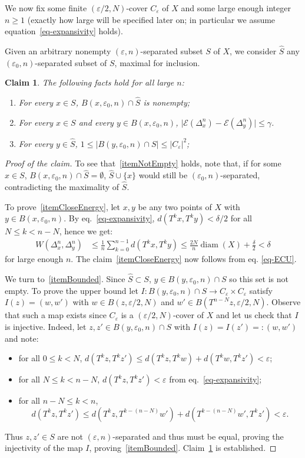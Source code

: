 \documentclass[AHL, Unicode, longabstracts,published]{cedram}
\theoremstyle{plain}
\theoremstyle{plain}
\newtheorem{claim}{Claim}
\newcommand\eps{\varepsilon}
\newcommand{\diam}{\operatorname{diam}}
\newcounter{In}
\newcommand*\8{\infty}
\newcommand\hS{\widehat{S}}
\newcommand{\En}{\mathcal{E}}
\newcommand*{\romanenumi}{\renewcommand*{\theenumi}{\roman{enumi}}}
\begin{document}
We now fix some finite $(\eps/2,N)$-cover $C_\eps$ of $X$ and some large enough integer $n\geq1$ (exactly how large will be specified later on; in particular we assume equation~\eqref{eq-expansivity} holds).


Given an arbitrary nonempty $(\eps,n)$-separated subset $S$ of $X$, we consider $\hS$ any $(\eps_0,n)$-separated subset of $S$, maximal for inclusion.

\begin{claim}\label{claim-W}
The following facts hold for all large $n$:
\begin{enumerate}\romanenumi
\item\label{itemNotEmpty}
For every $x\in S$, $B(x,\eps_0,n)\cap \hS$ is nonempty;
\item\label{itemCloseEnergy}
For every $x\in S$ and every $y\in B(x,\eps_0,n)$, $\lvert \En(\Delta^n_x)-\En(\Delta^n_y) \rvert \leq \gamma $.
\item\label{itemBounded}
For every $y\in \hS$, $1\le \lvert B(y,\eps_0,n)\cap S \rvert \le \lvert C_\eps\rvert^2$;
\end{enumerate}
\end{claim}

\begin{proof}[Proof of the claim]
To see that~\eqref{itemNotEmpty} holds, note that, if for some $x\in S$, $B(x,\eps_0,n)\cap \hS=\emptyset$, $\hS\cup\{x\}$ would still be $(\eps_0,n)$-separated, contradicting the maximality of $\hS$.

To prove~\eqref{itemCloseEnergy}, let $x,y$ be any two points of $X$ with $y\in B(x,\eps_0,n)$. By eq.~\eqref{eq-expansivity}, $d(T^kx,T^ky)<\delta/2$ for all $N\leq k<n-N$, hence we get:
\[
\begin{aligned}
W\left(\Delta^n_x,\Delta^n_y\right) &\leq \frac1n\sum_{k=0}^{n-1} d\left(T^kx,T^ky\right)
\leq \frac{2N}{n}\diam(X) + \frac\delta2 <\delta
\end{aligned}
\]
for large enough $n$. The claim~\eqref{itemCloseEnergy} now follows from eq. \eqref{eq-ECU}.

We turn to~\eqref{itemBounded}. Since $\hS\subset S$, $y\in B(y,\eps_0,n)\cap S$ so this set is not empty. To prove the upper bound let $I:B(y,\eps_0,n)\cap S\to C_\eps\times C_\eps$ satisfy $I(z)=(w,w')$ with $w\in B(z,\eps/2,N)$ and $w'\in B(T^{n-N}z,\eps/2,N)$. Observe that such a map exists since $C_\eps$ is a $(\eps/2,N)$-cover of $X$ and let us check that $I$ is injective. Indeed, let $z,z'\in B(y,\eps_0,n)\cap S$ with $I(z)=I(z')=:(w,w')$ and note:
\begin{itemize}
\item for all $0\leq k<N$, $d(T^kz,T^kz')\leq d(T^kz,T^kw)+d(T^kw,T^kz') <\eps$;
\item for all $N\leq k<n-N$, $d(T^kz,T^kz') < \eps$ from eq.~\eqref{eq-expansivity};
\item for all $n-N\leq k<n$,
\[
d\left(T^kz,T^kz'\right)\leq d\left(T^kz,T^{k-(n-N)}w'\right)+d\left(T^{k-(n-N)}w',T^kz'\right) <\eps.
\]
\end{itemize}
Thus $z,z'\in S$ are not $(\eps,n)$-separated and thus must be equal, proving the injectivity of the map $I$, proving~\eqref{itemBounded}. Claim~\ref{claim-W} is established.
\end{proof}
\end{document}
